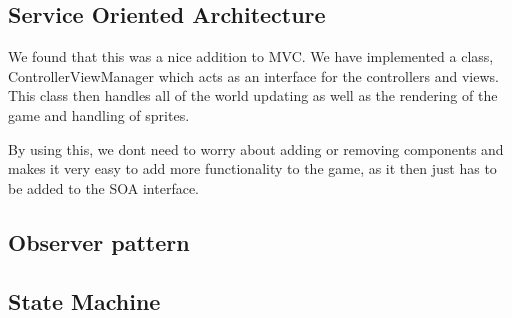 \subsection{Service Oriented Architecture}
We found that this was a nice addition to MVC. We have implemented a class, ControllerViewManager which acts as an interface for the controllers and views. This class then handles all of the world updating as well as the rendering of the game and handling of sprites. 

By using this, we dont need to worry about adding or removing components and makes it very easy to add more functionality to the game, as it then just has to be added to the SOA interface.


\subsection{Observer pattern}



\subsection{State Machine}